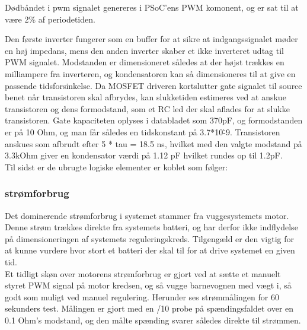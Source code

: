 Dødbåndet i pwm signalet genereres i PSoC'ens PWM komonent, og er sat til at være 2\% af periodetiden.  


Den første inverter fungerer som en buffer for at sikre at indgangssignalet møder en høj impedans, mens den anden inverter skaber et ikke inverteret udtag til PWM signalet. Modstanden er dimensioneret således at der højst trækkes en milliampere fra inverteren, og kondensatoren kan så dimensioneres til at give en passende tidsforsinkelse. Da MOSFET driveren kortslutter gate signalet til source benet når transistoren skal afbrydes, kan slukketiden estimeres ved at anskue transistoren og dens formodstand, som et RC led der skal aflades for at slukke transistoren. Gate kapaciteten oplyses i databladet som 370pF, og formodstanden er på 10 Ohm, og man får således en tidskonstant på 3.7*10\^-9. Transistoren anskues som afbrudt efter 5 * tau = 18.5 ns, hvilket med den valgte modstand på 3.3kOhm giver en kondensator værdi på 1.12 pF hvilket rundes op til 1.2pF. \\
Til sidst er de ubrugte logiske elementer er koblet som følger:


\subsubsection{strømforbrug}
Det dominerende strømforbrug i systemet stammer fra vuggesystemets motor. Denne strøm trækkes direkte fra systemets batteri, og har derfor ikke indflydelse på dimensioneringen af systemets reguleringskreds. Tilgengæld er den vigtig for at kunne vurdere hvor stort et batteri der skal til for at drive systemet en given tid.\\ 
Et tidligt skøn over motorens strømforbrug er gjort ved at sætte et manuelt styret PWM signal på motor kredsen, og så vugge barnevognen med vægt i, så godt som muligt ved manuel regulering. Herunder ses strømmålingen for 60 sekunders test. Målingen er gjort med en /10 probe på spændingsfaldet over en 0.1 Ohm's modstand, og den målte spænding svarer således direkte til strømmen.\\


